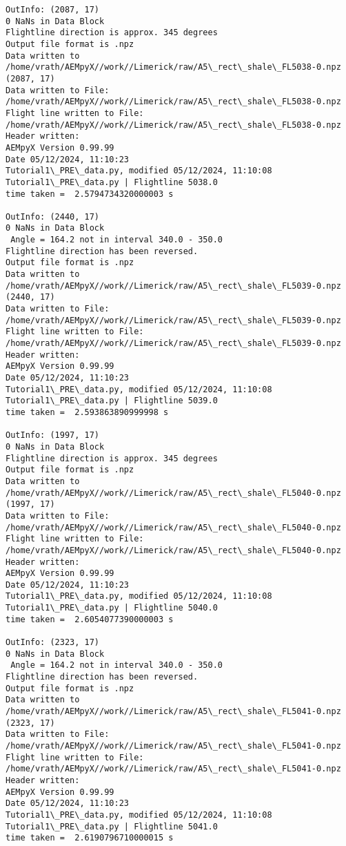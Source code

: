 \documentclass[11pt]{article}
\begin{document}
\begin{Verbatim}[commandchars=\\\{\}]
OutInfo: (2087, 17)
0 NaNs in Data Block
Flightline direction is approx. 345 degrees
Output file format is .npz
Data written to
/home/vrath/AEMpyX//work//Limerick/raw/A5\_rect\_shale\_FL5038-0.npz
(2087, 17)
Data written to File:
/home/vrath/AEMpyX//work//Limerick/raw/A5\_rect\_shale\_FL5038-0.npz
Flight line written to File:
/home/vrath/AEMpyX//work//Limerick/raw/A5\_rect\_shale\_FL5038-0.npz
Header written:
AEMpyX Version 0.99.99
Date 05/12/2024, 11:10:23
Tutorial1\_PRE\_data.py, modified 05/12/2024, 11:10:08
Tutorial1\_PRE\_data.py | Flightline 5038.0
time taken =  2.5794734320000003 s

OutInfo: (2440, 17)
0 NaNs in Data Block
 Angle = 164.2 not in interval 340.0 - 350.0
Flightline direction has been reversed.
Output file format is .npz
Data written to
/home/vrath/AEMpyX//work//Limerick/raw/A5\_rect\_shale\_FL5039-0.npz
(2440, 17)
Data written to File:
/home/vrath/AEMpyX//work//Limerick/raw/A5\_rect\_shale\_FL5039-0.npz
Flight line written to File:
/home/vrath/AEMpyX//work//Limerick/raw/A5\_rect\_shale\_FL5039-0.npz
Header written:
AEMpyX Version 0.99.99
Date 05/12/2024, 11:10:23
Tutorial1\_PRE\_data.py, modified 05/12/2024, 11:10:08
Tutorial1\_PRE\_data.py | Flightline 5039.0
time taken =  2.593863890999998 s

OutInfo: (1997, 17)
0 NaNs in Data Block
Flightline direction is approx. 345 degrees
Output file format is .npz
Data written to
/home/vrath/AEMpyX//work//Limerick/raw/A5\_rect\_shale\_FL5040-0.npz
(1997, 17)
Data written to File:
/home/vrath/AEMpyX//work//Limerick/raw/A5\_rect\_shale\_FL5040-0.npz
Flight line written to File:
/home/vrath/AEMpyX//work//Limerick/raw/A5\_rect\_shale\_FL5040-0.npz
Header written:
AEMpyX Version 0.99.99
Date 05/12/2024, 11:10:23
Tutorial1\_PRE\_data.py, modified 05/12/2024, 11:10:08
Tutorial1\_PRE\_data.py | Flightline 5040.0
time taken =  2.6054077390000003 s

OutInfo: (2323, 17)
0 NaNs in Data Block
 Angle = 164.2 not in interval 340.0 - 350.0
Flightline direction has been reversed.
Output file format is .npz
Data written to
/home/vrath/AEMpyX//work//Limerick/raw/A5\_rect\_shale\_FL5041-0.npz
(2323, 17)
Data written to File:
/home/vrath/AEMpyX//work//Limerick/raw/A5\_rect\_shale\_FL5041-0.npz
Flight line written to File:
/home/vrath/AEMpyX//work//Limerick/raw/A5\_rect\_shale\_FL5041-0.npz
Header written:
AEMpyX Version 0.99.99
Date 05/12/2024, 11:10:23
Tutorial1\_PRE\_data.py, modified 05/12/2024, 11:10:08
Tutorial1\_PRE\_data.py | Flightline 5041.0
time taken =  2.6190796710000015 s


\end{Verbatim}
\end{document}
